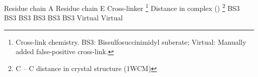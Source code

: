 \startlocalfootnotes
\bTABLE
\bTABLEhead
\bTR
\bTD Residue chain A \eTD \bTD Residue chain E \eTD 
\bTD Cross-linker \footnote{Cross-link chemistry. BS3: Bissulfosuccinimidyl
suberate; Virtual: Manually added false-positive cross-link.} \eTD 
\bTD Distance in complex (\Angstrom) \footnote{C\m{_\beta} -- C\m{_\beta}
distance in crystal structure (1WCM)} \eTD
\eTR
\eTABLEhead
\bTABLEbody
\bTR
{} \eTD {} \eTD \bTD BS3 \eTD {} \eTD
\eTR
\bTR
{} \eTD {} \eTD \bTD BS3 \eTD {} \eTD
\eTR
\bTR
{} \eTD {} \eTD \bTD BS3 \eTD {} \eTD
\eTR
\bTR
{} \eTD {} \eTD \bTD BS3 \eTD {} \eTD
\eTR
\bTR
{} \eTD {} \eTD \bTD BS3 \eTD {} \eTD
\eTR
\bTR
{} \eTD {} \eTD \bTD BS3 \eTD {} \eTD
\eTR
\bTR
{} \eTD {} \eTD \bTD Virtual \eTD {} \eTD
\eTR
\bTR
{} \eTD {} \eTD \bTD Virtual \eTD {} \eTD
\eTR
\eTABLEbody
\eTABLE
\placelocalfootnotes
\stoplocalfootnotes
